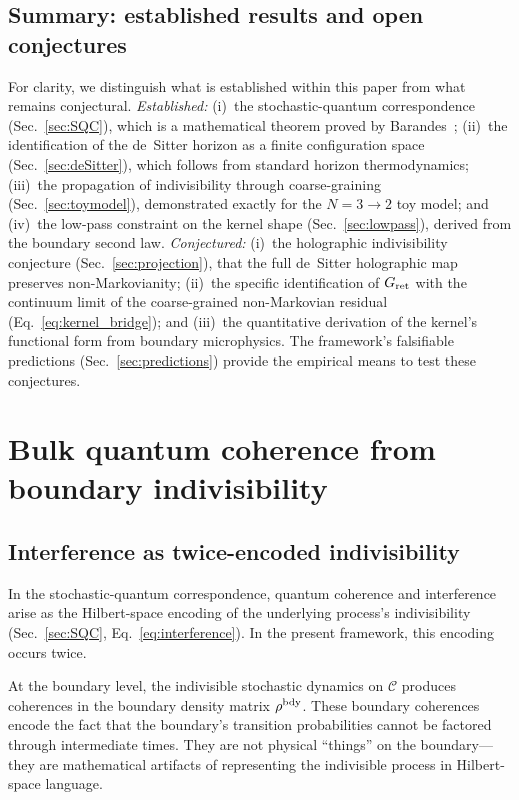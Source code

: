 \documentclass[aps,prd,twocolumn,superscriptaddress,nofootinbib]{revtex4-2}
\begin{document}
\subsection{Summary: established results and open conjectures}

For clarity, we distinguish what is established within this paper from what remains conjectural. \emph{Established:} (i)~the stochastic-quantum correspondence (Sec.~\ref{sec:SQC}), which is a mathematical theorem proved by Barandes~\cite{Barandes2025SQT}; (ii)~the identification of the de~Sitter horizon as a finite configuration space (Sec.~\ref{sec:deSitter}), which follows from standard horizon thermodynamics; (iii)~the propagation of indivisibility through coarse-graining (Sec.~\ref{sec:toymodel}), demonstrated exactly for the $N = 3 \to 2$ toy model; and (iv)~the low-pass constraint on the kernel shape (Sec.~\ref{sec:lowpass}), derived from the boundary second law. \emph{Conjectured:} (i)~the holographic indivisibility conjecture (Sec.~\ref{sec:projection}), that the full de~Sitter holographic map preserves non-Markovianity; (ii)~the specific identification of $G_{\rm ret}$ with the continuum limit of the coarse-grained non-Markovian residual (Eq.~\ref{eq:kernel_bridge}); and (iii)~the quantitative derivation of the kernel's functional form from boundary microphysics. The framework's falsifiable predictions (Sec.~\ref{sec:predictions}) provide the empirical means to test these conjectures.


\section{Bulk quantum coherence from boundary indivisibility}
\label{sec:coherence}

\subsection{Interference as twice-encoded indivisibility}

In the stochastic-quantum correspondence, quantum coherence and interference arise as the Hilbert-space encoding of the underlying process's indivisibility (Sec.~\ref{sec:SQC}, Eq.~\eqref{eq:interference}). In the present framework, this encoding occurs twice.

At the boundary level, the indivisible stochastic dynamics on $\mathcal{C}$ produces coherences in the boundary density matrix $\rho^{\rm bdy}$. These boundary coherences encode the fact that the boundary's transition probabilities cannot be factored through intermediate times. They are not physical ``things'' on the boundary---they are mathematical artifacts of representing the indivisible process in Hilbert-space language.
\end{document}
